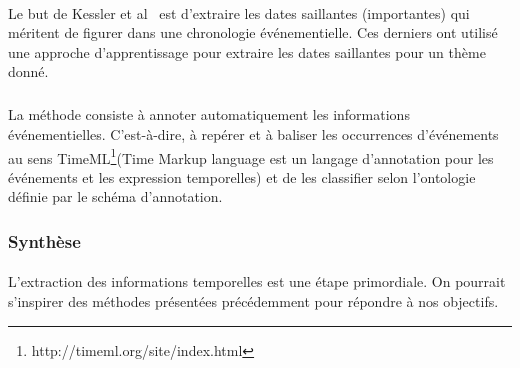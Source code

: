 \documentclass[12pt,a4]{report}
\begin{document}
\paragraph{}
Le but de Kessler et al~\cite{kessler2013} est d'extraire les dates saillantes (importantes) qui méritent de figurer dans une chronologie événementielle.
Ces derniers ont utilisé une approche d’apprentissage pour extraire les dates saillantes pour un thème donné.
\subparagraph{}
La méthode consiste à annoter automatiquement les informations événementielles. C’est-à-dire, à  repérer et à baliser les occurrences d’événements au sens TimeML\footnote{http://timeml.org/site/index.html}(Time Markup language est un langage d'annotation pour les événements et les expression temporelles) et de les classifier selon l’ontologie définie par le schéma d’annotation.
\subsubsection{Synthèse}
\paragraph{}
L'extraction des informations temporelles est une étape primordiale. On pourrait s'inspirer des méthodes présentées précédemment pour répondre à nos objectifs.


\printglossary[title=Glossaire]
\end{document}
